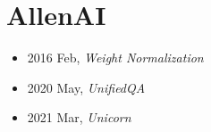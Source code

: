 \section{AllenAI}\label{com:AllenAI}

\begin{itemize}
    \item 2016 Feb, \textit{Weight Normalization}\cite{WeightNormalization}
    \item 2020 May, \textit{UnifiedQA}\cite{UnifiedQA}
    \item 2021 Mar, \textit{Unicorn}\cite{Unicorn}
    
\end{itemize}
